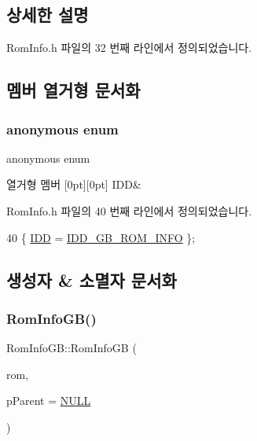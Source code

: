 \subsection{상세한 설명}


Rom\+Info.\+h 파일의 32 번째 라인에서 정의되었습니다.



\subsection{멤버 열거형 문서화}
\mbox{\label{class_rom_info_g_b_a064c2e7a699087424ed18892356145f5}} 
\subsubsection{\texorpdfstring{anonymous enum}{anonymous enum}}
{\footnotesize\ttfamily anonymous enum}

\begin{DoxyEnumFields}{열거형 멤버}
[0pt][0pt]{}\mbox{\label{class_rom_info_g_b_a064c2e7a699087424ed18892356145f5aa168de60cf7ad6f99a78e4e9ffb7409c}} 
I\+DD&\\
\hline

\end{DoxyEnumFields}


Rom\+Info.\+h 파일의 40 번째 라인에서 정의되었습니다.


\begin{DoxyCode}
40 \{ \mbox{\hyperlink{class_rom_info_g_b_a064c2e7a699087424ed18892356145f5aa168de60cf7ad6f99a78e4e9ffb7409c}{IDD}} = \mbox{\hyperlink{resource_8h_a090ec2519cbb176e25994c1c63bed5b4}{IDD\_GB\_ROM\_INFO}} \};
\end{DoxyCode}


\subsection{생성자 \& 소멸자 문서화}
\mbox{\label{class_rom_info_g_b_a89d8213c4f8c05b76fdf395757a51cef}} 
\subsubsection{\texorpdfstring{Rom\+Info\+G\+B()}{RomInfoGB()}}
{\footnotesize\ttfamily Rom\+Info\+G\+B\+::\+Rom\+Info\+GB (\begin{DoxyParamCaption}\item[{\mbox{\hyperlink{_system_8h_aed742c436da53c1080638ce6ef7d13de}{u8}} $\ast$}]{rom,  }\item[{C\+Wnd $\ast$}]{p\+Parent = {\ttfamily \mbox{\hyperlink{_system_8h_a070d2ce7b6bb7e5c05602aa8c308d0c4}{N\+U\+LL}}} }\end{DoxyParamCaption})}



